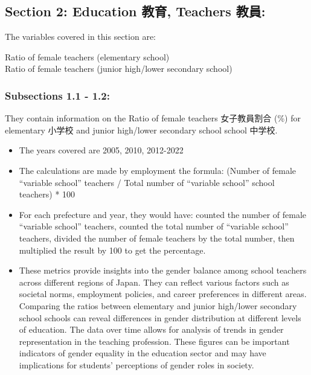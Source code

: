 \documentclass[
  12pt,
  letterpaper,
  DIV=11,
  numbers=noendperiod]{scrartcl}
\begin{document}
\hypertarget{section-2-education-ux6559ux80b2-teachers-ux6559ux54e1}{%
\subsection{Section 2: Education 教育, Teachers
教員:}\label{section-2-education-ux6559ux80b2-teachers-ux6559ux54e1}}

The variables covered in this section are:

Ratio of female teachers (elementary school)\\
Ratio of female teachers (junior high/lower secondary school)

\hypertarget{subsections-1.1---1.2}{%
\subsubsection{Subsections 1.1 - 1.2:}\label{subsections-1.1---1.2}}

They contain information on the Ratio of female teachers 女子教員割合
(\%) for elementary 小学校 and junior high/lower secondary school school
中学校.

\begin{itemize}
\item
  The years covered are 2005, 2010, 2012-2022
\item
  The calculations are made by employment the formula: (Number of female
  ``variable school'' teachers / Total number of ``variable school''
  school teachers) * 100
\item
  For each prefecture and year, they would have: counted the number of
  female ``variable school'' teachers, counted the total number of
  ``variable school'' teachers, divided the number of female teachers by
  the total number, then multiplied the result by 100 to get the
  percentage.
\item
  These metrics provide insights into the gender balance among school
  teachers across different regions of Japan. They can reflect various
  factors such as societal norms, employment policies, and career
  preferences in different areas. Comparing the ratios between
  elementary and junior high/lower secondary school schools can reveal
  differences in gender distribution at different levels of education.
  The data over time allows for analysis of trends in gender
  representation in the teaching profession. These figures can be
  important indicators of gender equality in the education sector and
  may have implications for students' perceptions of gender roles in
  society.
\end{itemize}
\end{document}
